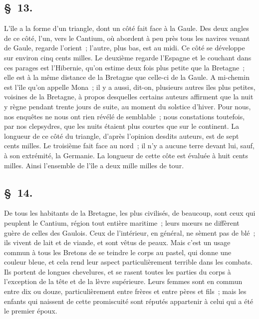 \documentclass[french,twoside]{book} %
\begin{document}
\subsection[{§ 13.}]{ \textsc{§ 13.} }
\noindent L'île a la forme d’un triangle, dont un côté fait face à la Gaule. Des deux angles de ce côté, l’un, vers le Cantium, où abordent à peu près tous les navires venant de Gaule, regarde l’orient ; l’autre, plus bas, est au midi. Ce côté se développe sur environ cinq cents milles. Le deuxième regarde l’Espagne et le couchant dans ces parages est l’Hibernie, qu’on estime deux fois plus petite que la Bretagne ; elle est à la même distance de la Bretagne que celle-ci de la Gaule. A mi-chemin est l’île qu’on appelle Mona ; il y a aussi, dit-on, plusieurs autres îles plus petites, voisines de la Bretagne, à propos desquelles certains auteurs affirment que la nuit y règne pendant trente jours de suite, au moment du solstice d’hiver. Pour nous, nos enquêtes ne nous ont rien révélé de semblable ; nous constations toutefois, par nos clepsydres, que les nuits étaient plus courtes que sur le continent. La longueur de ce côté du triangle, d’après l’opinion desdits auteurs, est de sept cents milles. Le troisième fait face au nord ; il n’y a aucune terre devant lui, sauf, à son extrémité, la Germanie. La longueur de cette côte est évaluée à huit cents milles. Ainsi l’ensemble de l’île a deux mille milles de tour.
\subsection[{§ 14.}]{ \textsc{§ 14.} }
\noindent De tous les habitants de la Bretagne, les plus civilisés, de beaucoup, sont ceux qui peuplent le Cantium, région tout entière maritime ; leurs mœurs ne diffèrent guère de celles des Gaulois. Ceux de l’intérieur, en général, ne sèment pas de blé ; ils vivent de lait et de viande, et sont vêtus de peaux. Mais c’est un usage commun à tous les Bretons de se teindre le corps au pastel, qui donne une couleur bleue, et cela rend leur aspect particulièrement terrible dans les combats. Ils portent de longues chevelures, et se rasent toutes les parties du corps à l’exception de la tête et de la lèvre supérieure. Leurs femmes sont en commun entre dix ou douze, particulièrement entre frères et entre pères et fils ; mais les enfants qui naissent de cette promiscuité sont réputés appartenir à celui qui a été le premier époux.
\end{document}
